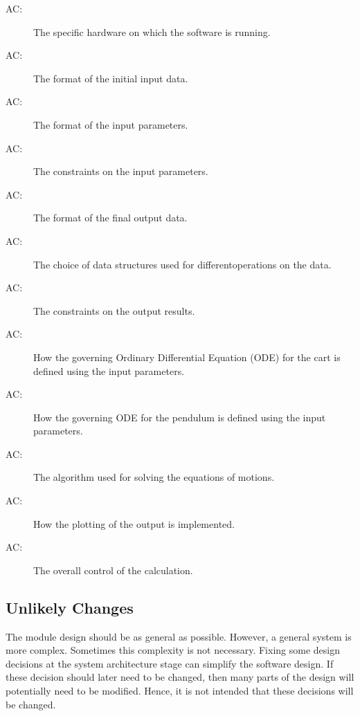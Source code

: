 \documentclass[12pt, titlepage]{article}
\newcounter{acnum}
\newcommand{\actheacnum}{AC\theacnum}
\begin{document}
\begin{description}
\item[ \actheacnum \label{acHardware}:] The specific
  hardware on which the software is running.
\item[ \actheacnum \label{acInput}:] The format of the initial input data.
\item[ \actheacnum \label{acParams}:] The format of the  input parameters.
\item[ \actheacnum \label{acVerify}:] The constraints on
  the input parameters.
\item[ \actheacnum \label{acOutput}:] The format of the  final output data.
\item[ \actheacnum \label{acDS}:] The choice of data structures used for differentoperations on the data.
\item[ \actheacnum \label{acVerifyOut}:] The constraints on the output results.
\item[ \actheacnum \label{acODEsC}:] How the governing Ordinary Differential Equation (ODE) for the cart is defined using the input parameters.
\item[ \actheacnum \label{acODEsP}:] How the governing ODE for the pendulum is defined using the input parameters.
\item[ \actheacnum \label{acSolver}:] The algorithm used for solving the equations of motions.
\item[ \actheacnum \label{acPlot}:] How the plotting of the output is implemented.
\item[ \actheacnum \label{acControl}:] The overall control of the calculation.
\end{description}

\subsection{Unlikely Changes} \label{SecUchange}

The module design should be as general as possible. However, a general system is
more complex. Sometimes this complexity is not necessary. Fixing some design
decisions at the system architecture stage can simplify the software design. If
these decision should later need to be changed, then many parts of the design
will potentially need to be modified. Hence, it is not intended that these
decisions will be changed.
\end{document}
